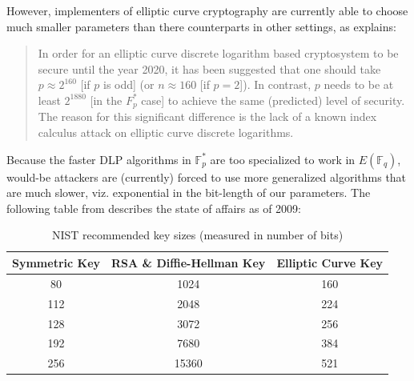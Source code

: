 However, implementers of elliptic curve cryptography are currently able to
    choose much smaller parameters than there counterparts in other settings,
    as \cite{stinson2005cryptography} explains:
\begin{quote}
In order for an elliptic curve discrete logarithm based cryptosystem to be
    secure until the year 2020, it has been suggested that one should take $p
    \approx 2^{160}$ [if $p$ is odd] (or $n \approx 160$ [if $p = 2$]).
In contrast, $p$ needs to be at least $2^{1880}$ [in the $F_p^\ast$ case] to
  achieve the same (predicted) level of security.
The reason for this significant difference is the lack of a known index
    calculus attack on elliptic curve discrete logarithms.
\end{quote}
Because the faster DLP algorithms in $\mathbb{F}_p^\ast$ are too specialized to
    work in $E(\mathbb{F}_q)$, would-be attackers are (currently) forced to use
    more generalized algorithms that are much slower, viz. exponential in the
    bit-length of our parameters.
The following table from \cite{agency2009lr} describes the state of affairs as
of 2009:
\begin{table}[htbp]
  \centering
  \begin{tabular}[htbp]{| c | c | c |}
    \hline
    Symmetric Key & RSA \& Diffie-Hellman Key & Elliptic Curve Key\\
    \hline
    80 & 1024 & 160\\
    112 & 2048 & 224\\
    128 & 3072 & 256\\
    192 & 7680 & 384\\
    256 & 15360 & 521\\
    \hline
  \end{tabular}
  \caption{NIST recommended key sizes (measured in number of bits)}
  \label{tab:nrks}
\end{table}

